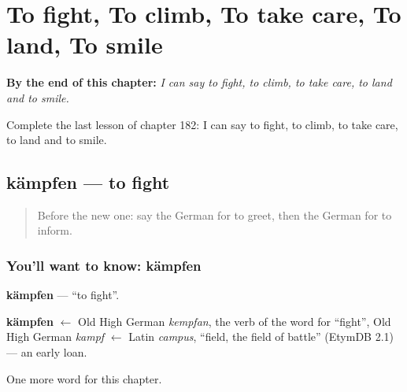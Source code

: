 
\chapter{To fight, To climb, To take care, To land, To smile}
\label{ch:ge-to-fight-to-climb-to-take-care-to-land-to-smile}

\begin{chapteropening}
\textbf{By the end of this chapter:} \emph{I can say to fight, to climb, to take care, to land and to smile.}

Complete the last lesson of chapter 182: I can say to fight, to climb, to take care, to land and to smile.
\end{chapteropening}

\section[kämpfen]{kämpfen — to fight}

\label{lesson:GE-C182-kaempfen}



\begin{quote}
Before the new one: say the German for to greet, then the German for to inform.
\end{quote}

\subsection*{You'll want to know: kämpfen}
\textbf{kämpfen} — \textquotedblleft{}to fight\textquotedblright{}.

\begin{cousinweb}
\textbf{kämpfen} $\leftarrow$ Old High German \emph{kempfan}, the verb of the word for \textquotedblleft{}fight\textquotedblright{}, Old High German \emph{kampf} $\leftarrow$ Latin \emph{campus}, \textquotedblleft{}field, the field of battle\textquotedblright{} (EtymDB 2.1) — an early loan.
\end{cousinweb}

\begin{grammarlens}[title={What you've built}]
One more word for this chapter.
\end{grammarlens}

